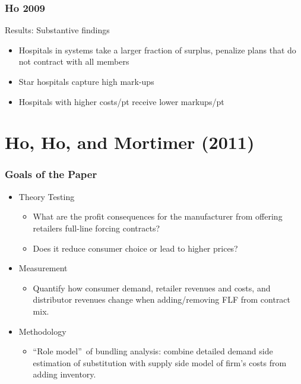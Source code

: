 \documentclass[notes=show]{beamer}
\begin{document}
\begin{frame}
\frametitle{Ho 2009}

Results: Substantive findings
\begin{itemize}
\item Hospitals in systems take a larger fraction of surplus, penalize plans that do not contract with all members
\item Star hospitals capture high mark-ups
\item Hospitals with higher costs/pt receive lower markups/pt
\end{itemize}
\end{frame}


\section{Ho, Ho, and Mortimer (2011)}


\begin{frame}
\frametitle{Goals of the Paper}

\begin{itemize}
\item Theory Testing

\begin{itemize}
\item What are the profit consequences for the manufacturer from offering
retailers full-line forcing contracts?

\item Does it reduce consumer choice or lead to higher prices?
\end{itemize}

\item Measurement

\begin{itemize}
\item Quantify how consumer demand, retailer revenues and costs, and
distributor revenues change when adding/removing FLF from contract mix.
\end{itemize}

\item Methodology

\begin{itemize}

\item \textquotedblleft Role model\textquotedblright \ of bundling analysis:
combine detailed demand side estimation of substitution with supply side
model of firm's costs from adding inventory.
\end{itemize}
\end{itemize}
\end{frame}
\end{document}
